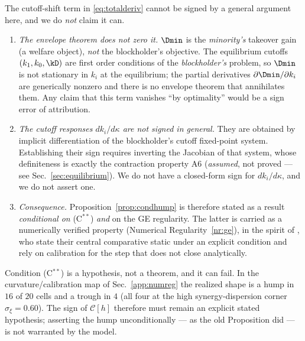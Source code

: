 \begin{remark}
\label{rem:ge-honesty}
The cutoff-shift term in \eqref{eq:totalderiv} cannot be signed by a
general argument here, and we do \emph{not} claim it can.
\begin{enumerate}
\item \emph{The envelope theorem does not zero it.} $\Dmin$ is the
\emph{minority's} takeover gain (a welfare object), \emph{not} the
blockholder's objective. The equilibrium cutoffs $(k_1,k_0,\kD)$ are first
order conditions of the \emph{blockholder's} problem, so $\Dmin$ is not
stationary in $k_i$ at the equilibrium; the partial derivatives
$\partial\Dmin/\partial k_i$ are generically nonzero and there is no
envelope theorem that annihilates them. Any claim that this term vanishes
``by optimality'' would be a sign error of attribution.
\item \emph{The cutoff responses $dk_i/d\kappa$ are not signed in general.}
They are obtained by implicit differentiation of the blockholder's cutoff
fixed-point system. Establishing their sign requires inverting the Jacobian
of that system, whose definiteness is exactly the contraction property A6
(\emph{assumed}, not proved --- see Sec.~\ref{sec:equilibrium}). We do not
have a closed-form sign for $dk_i/d\kappa$, and we do not assert one.
\item \emph{Consequence.} Proposition~\ref{prop:condhump} is therefore
stated as a result \emph{conditional on} (C$^{\ast\ast}$) \emph{and} on the
GE regularity. The latter is carried as a numerically verified property
(Numerical Regularity~\ref{nr:ge}), in the spirit of
\citet{edmansGovernanceTrading2015}, who state their central comparative
static under an explicit condition and rely on calibration for the step that
does not close analytically.
\end{enumerate}
\end{remark}

\begin{remark}
\label{rem:conditional}
Condition (C$^{\ast\ast}$) is a hypothesis, not a theorem, and it can fail.
In the curvature/calibration map of Sec.~\ref{app:numreg} the realized shape
is a hump in $16$ of $20$ cells and a trough in $4$ (all four at the high
synergy-dispersion corner $\sigma_\xi=0.60$). The sign of $\mathcal{C}[h]$
therefore must remain an explicit stated hypothesis; asserting the hump
unconditionally --- as the old Proposition did --- is not warranted by the
model.
\end{remark}

